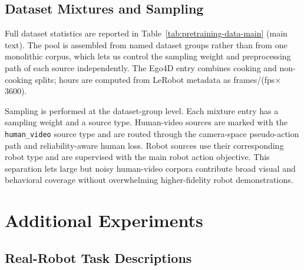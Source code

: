 \subsection{Dataset Mixtures and Sampling}
\label{app:dataset-mixtures}

Full dataset statistics are reported in Table~\ref{tab:pretraining-data-main} (main text). The pool is assembled from named dataset groups rather than from one monolithic corpus, which lets us
control the sampling weight and preprocessing path of each source independently. The Ego4D entry combines cooking and non-cooking splits; hours are computed from LeRobot metadata as
frames/(fps$\times$3600).

Sampling is performed at the dataset-group level. Each mixture entry has a sampling weight and a source type. Human-video sources are marked with the \texttt{human\_video} source type and are routed
through the camera-space pseudo-action path and reliability-aware human loss. Robot sources use their corresponding robot type and are supervised with the main robot action objective. This separation lets
large but noisy human-video corpora contribute broad visual and behavioral coverage without overwhelming higher-fidelity robot demonstrations.

\section{Additional Experiments}
\label{app:additional-experiments}



\subsection{Real-Robot Task Descriptions}
\label{app:real-robot-task-descriptions}

